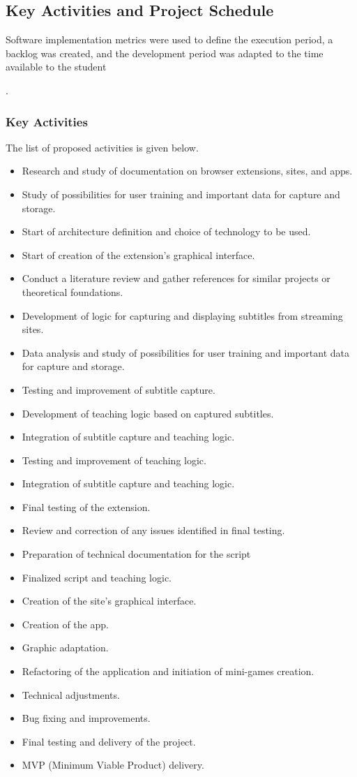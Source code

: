 \documentclass[12pt]{article}
\begin{document}
\subsection{Key Activities and Project Schedule}

Software implementation metrics were used to define the execution period, a backlog was created, and the development period was adapted to the time available to the student \author{J. Emanuel Cascone R. S.}.

\subsubsection{Key Activities}

The list of proposed activities is given below.

\begin{itemize}
\item Research and study of documentation on browser extensions, sites, and apps.
\item Study of possibilities for user training and important data for capture and storage.
\item Start of architecture definition and choice of technology to be used.
\item Start of creation of the extension's graphical interface.
\item Conduct a literature review and gather references for similar projects or theoretical foundations.
\item Development of logic for capturing and displaying subtitles from streaming sites.
\item Data analysis and study of possibilities for user training and important data for capture and storage.
\item Testing and improvement of subtitle capture.
\item Development of teaching logic based on captured subtitles.
\item Integration of subtitle capture and teaching logic.
\item Testing and improvement of teaching logic.
\item Integration of subtitle capture and teaching logic.
\item Final testing of the extension.
\item Review and correction of any issues identified in final testing.
\item Preparation of technical documentation for the script 
\item Finalized script and teaching logic.
\item Creation of the site's graphical interface.
\item Creation of the app. 
\item Graphic adaptation.
\item Refactoring of the application and initiation of mini-games creation.
\item Technical adjustments.
\item Bug fixing and improvements.
\item Final testing and delivery of the project.
\item MVP (Minimum Viable Product) delivery.
\end {itemize}
\end{document}
